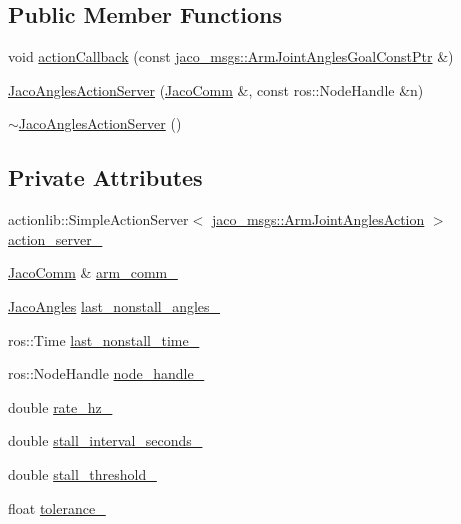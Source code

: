 \subsection*{Public Member Functions}
\begin{DoxyCompactItemize}
\item 
void \hyperlink{classjaco_1_1JacoAnglesActionServer_a3a3da8fd412f2311534246d2287a5b90}{action\+Callback} (const \hyperlink{namespacejaco__msgs_a9056d2fb29e6973f6db43a60138ffc7c}{jaco\+\_\+msgs\+::\+Arm\+Joint\+Angles\+Goal\+Const\+Ptr} \&)
\item 
\hyperlink{classjaco_1_1JacoAnglesActionServer_a53ddba342c38bb3d9cf34ad773d7189f}{Jaco\+Angles\+Action\+Server} (\hyperlink{classjaco_1_1JacoComm}{Jaco\+Comm} \&, const ros\+::\+Node\+Handle \&n)
\item 
\hyperlink{classjaco_1_1JacoAnglesActionServer_a6d6ed0c99c45e1eebab14bba3233580e}{$\sim$\+Jaco\+Angles\+Action\+Server} ()
\end{DoxyCompactItemize}
\subsection*{Private Attributes}
\begin{DoxyCompactItemize}
\item 
actionlib\+::\+Simple\+Action\+Server$<$ \hyperlink{namespacejaco__msgs_afc04c716621af8a0dfe0968d1db0f90c}{jaco\+\_\+msgs\+::\+Arm\+Joint\+Angles\+Action} $>$ \hyperlink{classjaco_1_1JacoAnglesActionServer_a29d204d1bff466987e69761085a3c532}{action\+\_\+server\+\_\+}
\item 
\hyperlink{classjaco_1_1JacoComm}{Jaco\+Comm} \& \hyperlink{classjaco_1_1JacoAnglesActionServer_a72ed0ccae4532199d387cc3bfe278cb0}{arm\+\_\+comm\+\_\+}
\item 
\hyperlink{classjaco_1_1JacoAngles}{Jaco\+Angles} \hyperlink{classjaco_1_1JacoAnglesActionServer_adb99422d834b8a2fa5f26ddd3ac95e52}{last\+\_\+nonstall\+\_\+angles\+\_\+}
\item 
ros\+::\+Time \hyperlink{classjaco_1_1JacoAnglesActionServer_afca8c9e29d0249737632a232e149400d}{last\+\_\+nonstall\+\_\+time\+\_\+}
\item 
ros\+::\+Node\+Handle \hyperlink{classjaco_1_1JacoAnglesActionServer_a9d3d8137fef5e34ffb99c8cc1c6e9e17}{node\+\_\+handle\+\_\+}
\item 
double \hyperlink{classjaco_1_1JacoAnglesActionServer_aba435023cc4e95378e8c77333bef1ccf}{rate\+\_\+hz\+\_\+}
\item 
double \hyperlink{classjaco_1_1JacoAnglesActionServer_a2bf773e52f5d3751001415e8121fe276}{stall\+\_\+interval\+\_\+seconds\+\_\+}
\item 
double \hyperlink{classjaco_1_1JacoAnglesActionServer_a7372c88107de61bb149cea6a60932f71}{stall\+\_\+threshold\+\_\+}
\item 
float \hyperlink{classjaco_1_1JacoAnglesActionServer_acc1edd1f538d1bf9c05c91c94a4abfa1}{tolerance\+\_\+}
\end{DoxyCompactItemize}


